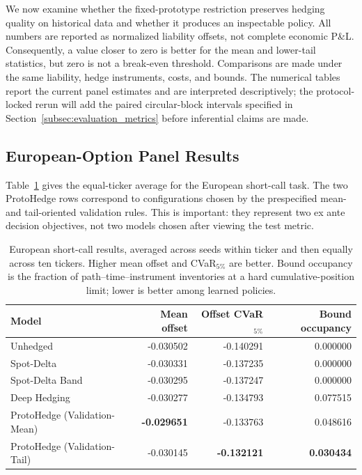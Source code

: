 \documentclass[sigconf]{acmart}
\begin{document}
We now examine whether the fixed-prototype restriction preserves hedging
quality on historical data and whether it produces an inspectable policy. All
numbers are reported as normalized liability offsets, not complete economic
P\&L. Consequently, a value closer to zero is better for the mean and lower-tail
statistics, but zero is not a break-even threshold. Comparisons are made under
the same liability, hedge instruments, costs, and bounds. The numerical tables
report the current panel estimates and are interpreted descriptively; the
protocol-locked rerun will add the paired circular-block intervals specified in
Section~\ref{subsec:evaluation_metrics} before inferential claims are made.

\subsection{European-Option Panel Results}
\label{subsec:european_results}

Table~\ref{tab:european-panel-average} gives the equal-ticker average for the
European short-call task. The two ProtoHedge rows correspond to configurations
chosen by the prespecified mean- and tail-oriented validation rules. This is
important: they represent two ex ante decision objectives, not two models
chosen after viewing the test metric.

\begin{table}[t]
\centering
\small
\begin{tabular}{lrrr}
\toprule
Model & Mean offset & Offset CVaR$_{5\%}$ & Bound occupancy \\
\midrule
Unhedged & -0.030502 & -0.140291 & 0.000000 \\
Spot-Delta & -0.030331 & -0.137235 & 0.000000 \\
Spot-Delta Band & -0.030295 & -0.137247 & 0.000000 \\
Deep Hedging & -0.030277 & -0.134793 & 0.077515 \\
ProtoHedge (Validation-Mean) & \textbf{-0.029651} & -0.133763 & 0.048616 \\
ProtoHedge (Validation-Tail) & -0.030145 & \textbf{-0.132121} & \textbf{0.030434} \\
\bottomrule
\end{tabular}
\caption{European short-call results, averaged across seeds within ticker and
then equally across ten tickers. Higher mean offset and CVaR$_{5\%}$ are
better. Bound occupancy is the fraction of path--time--instrument inventories
at a hard cumulative-position limit; lower is better among learned policies.}
\label{tab:european-panel-average}
\end{table}
\end{document}
